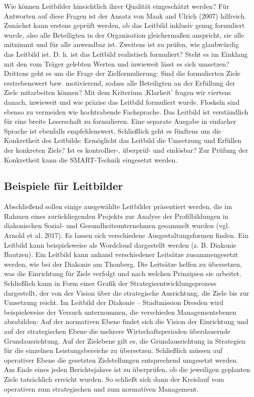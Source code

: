 \documentclass[
  letterpaper,
]{book}
\begin{document}
Wie können Leitbilder hinsichtlich ihrer Qualität eingeschätzt werden?
Für Antworten auf diese Fragen ist der Ansatz von Maak and Ulrich (2007)
hilfreich. Zunächst kann erstens geprüft werden, ob das Leitbild
inklusiv genug formuliert wurde, also alle Beteiligten in der
Organisation gleichermaßen anspricht, sie alle mitnimmt und für alle
anwendbar ist. Zweitens ist zu prüfen, wie glaubwürdig das Leitbild ist.
D. h. ist das Leitbild realistisch formuliert? Steht es im Einklang mit
den vom Träger gelebten Werten und inwieweit lässt es sich umsetzen?
Drittens geht es um die Frage der Zielformulierung: Sind die
formulierten Ziele erstrebenswert bzw. motivierend, sodass alle
Beteiligten an der Erfüllung der Ziele mitarbeiten können? Mit dem
Kriterium ‚Klarheit' fragen wir viertens danach, inwieweit und wie
präzise das Leitbild formuliert wurde. Floskeln sind ebenso zu vermeiden
wie hochtrabende Fachsprache. Das Leitbild ist verständlich für eine
breite Leserschaft zu formulieren. Eine separate Ausgabe in einfacher
Sprache ist ebenfalls empfehlenswert. Schließlich geht es fünftens um
die Konkretheit des Leitbilds: Ermöglicht das Leitbild die Umsetzung und
Erfüllen der konkreten Ziele? Ist es kontrollier-, überprüf- und
einlösbar? Zur Prüfung der Konkretheit kann die SMART-Technik eingesetzt
werden.

\subsection{Beispiele für Leitbilder}\label{beispiele-fuxfcr-leitbilder}

Abschließend sollen einige ausgewählte Leitbilder präsentiert werden,
die im Rahmen eines zurückliegenden Projekts zur Analyse der
Profilbildungen in diakonischen Sozial- und Gesundheitsunternehmen
gesammelt wurden (vgl. Arnold et al. 2017). Es lassen sich verschiedene
Ausgestaltungsformen finden. Ein Leitbild kann beispielsweise als
Wordcloud dargestellt werden (z. B. Diakonie Bautzen). Ein Leitbild kann
anhand verschiedener Leitsätze zusammengesetzt werden, wie bei der
Diakonie am Thonberg. Die Leitsätze helfen zu übersetzen, was die
Einrichtung für Ziele verfolgt und nach welchen Prinzipien sie arbeitet.
Schließlich kann in Form einer Grafik der Strategieentwicklungsprozess
dargestellt, der von der Vision über die strategische Ausrichtung, die
Ziele bis zur Umsetzung reicht. Im Leitbild der Diakonie -- Stadtmission
Dresden wird beispielsweise der Versuch unternommen, die verschieden
Managementebenen abzubilden: Auf der normativen Ebene findet sich die
Vision der Einrichtung und auf der strategischen Ebene die mehrere
Wirtschaftsperioden überdauernde Grundausrichtung. Auf der Zielebene
gilt es, die Grundausrichtung in Strategien für die einzelnen
Leistungsbereiche zu übersetzen. Schließlich müssen auf operativer Ebene
die gesetzten Zielstellungen entsprechend umgesetzt werden. Am Ende
eines jeden Berichtsjahres ist zu überprüfen, ob die jeweiligen
geplanten Ziele tatsächlich erreicht wurden. So schließt sich dann der
Kreislauf vom operativen zum strategischen und zum normativen
Management.
\end{document}
